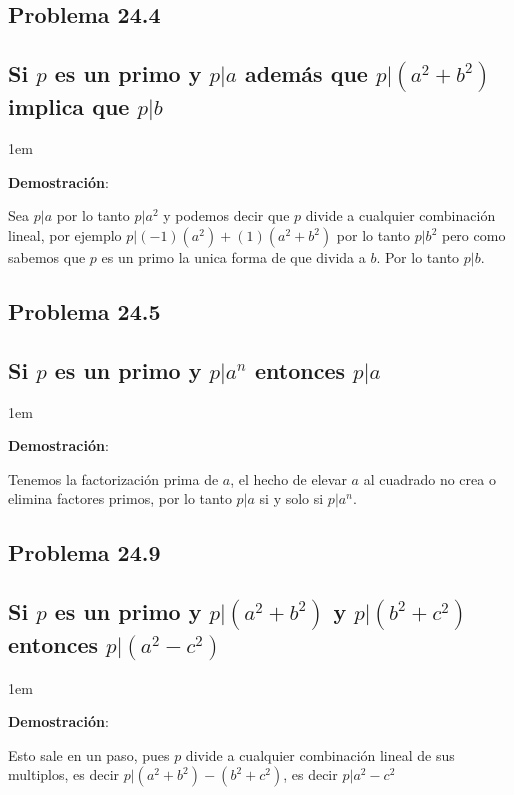 \documentclass[12pt, fleqn]{article}                             %
\newenvironment{SmallIndentation}[1][0.75em]                    %
    {\begin{adjustwidth}{#1}{}\begin{footnotesize}}                 %
    {\end{footnotesize}\end{adjustwidth}}                           %
\begin{document}
    \subsection{Problema 24.4}
    \subsection*{Si $p$ es un primo y $p|a$ además que $p|(a^2+b^2)$
        implica que $p|b$}

    \begin{SmallIndentation}[1em]
        \textbf{Demostración}:
        
        Sea $p|a$ por lo tanto $p|a^2$ y podemos decir que $p$ divide
        a cualquier combinación lineal, por ejemplo $p|(-1)(a^2)+(1)(a^2+b^2)$
        por lo tanto $p|b^2$ pero como sabemos que $p$ es un primo la unica
        forma de que divida a $b$. Por lo tanto $p|b$.

    \end{SmallIndentation}


    \subsection{Problema 24.5}
    \subsection*{Si $p$ es un primo y $p|a^n$ entonces $p|a$}

    \begin{SmallIndentation}[1em]
        \textbf{Demostración}:
        
        Tenemos la factorización prima de $a$, el hecho de elevar
        $a$ al cuadrado no crea o elimina factores primos, por lo tanto
        $p|a$ si y solo si $p|a^n$.

    \end{SmallIndentation}


    \subsection{Problema 24.9}
    \subsection*{Si $p$ es un primo y $p|(a^2+b^2)$
        y $p|(b^2+c^2)$ entonces $p|(a^2-c^2)$}

    \begin{SmallIndentation}[1em]
        \textbf{Demostración}:
        
        Esto sale en un paso, pues $p$ divide a cualquier combinación lineal
        de sus multiplos, es decir $p|(a^2+b^2)-(b^2+c^2)$, es decir
        $p|a^2-c^2$

    \end{SmallIndentation}
\end{document}
